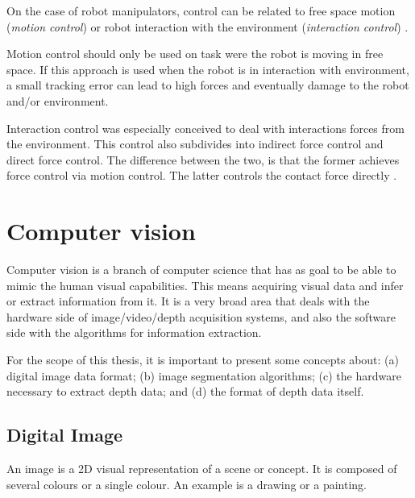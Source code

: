 On the case of robot manipulators, control can be related to free space motion (\emph{motion control}) or robot interaction with the environment (\emph{interaction control}) \cite{Siciliano1999_robot_force_control}. 

Motion control should only be used on task were the robot is moving in free space. If this approach is used when the robot is in interaction with environment, a small tracking error can lead to high forces and eventually damage to the robot and/or environment. 

Interaction control was especially conceived to deal with interactions forces from the environment. This control also subdivides into {indirect force control} and {direct force control}. The difference between the two, is that the former achieves force control via motion control. The latter controls the contact force directly \cite{Siciliano1999_robot_force_control}.




\section{Computer vision}
\label{sec:computer_vision}

Computer vision is a branch of computer science that has as goal to be able to mimic the human visual capabilities. This means acquiring visual data and infer or extract information from it. It is a very broad area that deals with the hardware side of image/video/depth acquisition systems, and also the software side with the algorithms for information extraction.

For the scope of this thesis, it is important to present some concepts about: (a) digital image data format; (b) image segmentation algorithms; (c) the hardware necessary to extract depth data; and (d) the format of depth data itself.

\subsection{Digital Image}
\label{subsec:digital_image}

An image is a 2D visual representation of a scene or concept. It is composed of several colours or a single colour. An example is a drawing or a painting.

